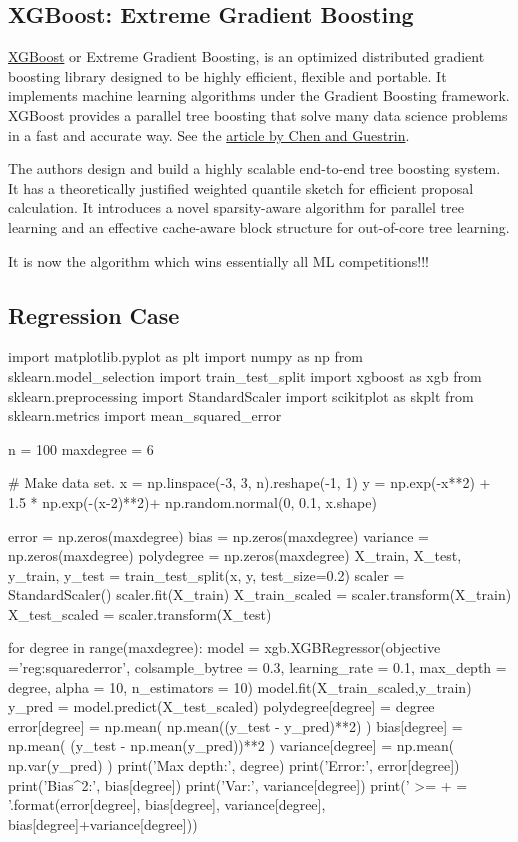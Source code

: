 \documentclass[%
oneside,                 %
final,                   %
10pt]{article}
\begin{document}
\subsection{XGBoost: Extreme Gradient Boosting}


\href{{https://github.com/dmlc/xgboost}}{XGBoost} or Extreme Gradient
Boosting, is an optimized distributed gradient boosting library
designed to be highly efficient, flexible and portable. It implements
machine learning algorithms under the Gradient Boosting
framework. XGBoost provides a parallel tree boosting that solve many
data science problems in a fast and accurate way. See the \href{{https://arxiv.org/abs/1603.02754}}{article by Chen and Guestrin}.

The authors design and build a highly scalable end-to-end tree
boosting system. It has  a theoretically justified weighted quantile
sketch for efficient proposal calculation. It introduces a novel sparsity-aware algorithm for parallel tree learning and an effective cache-aware block structure for out-of-core tree learning.

It is now the algorithm which wins essentially all ML competitions!!!

\subsection{Regression Case}

\bpycod
import matplotlib.pyplot as plt
import numpy as np
from sklearn.model_selection import train_test_split
import xgboost as xgb
from sklearn.preprocessing import StandardScaler
import scikitplot as skplt
from sklearn.metrics import mean_squared_error

n = 100
maxdegree = 6

# Make data set.
x = np.linspace(-3, 3, n).reshape(-1, 1)
y = np.exp(-x**2) + 1.5 * np.exp(-(x-2)**2)+ np.random.normal(0, 0.1, x.shape)

error = np.zeros(maxdegree)
bias = np.zeros(maxdegree)
variance = np.zeros(maxdegree)
polydegree = np.zeros(maxdegree)
X_train, X_test, y_train, y_test = train_test_split(x, y, test_size=0.2)
scaler = StandardScaler()
scaler.fit(X_train)
X_train_scaled = scaler.transform(X_train)
X_test_scaled = scaler.transform(X_test)

for degree in range(maxdegree):
    model =  xgb.XGBRegressor(objective ='reg:squarederror', colsample_bytree = 0.3, learning_rate = 0.1,
                max_depth = degree, alpha = 10, n_estimators = 10)
    model.fit(X_train_scaled,y_train)
    y_pred = model.predict(X_test_scaled)
    polydegree[degree] = degree
    error[degree] = np.mean( np.mean((y_test - y_pred)**2) )
    bias[degree] = np.mean( (y_test - np.mean(y_pred))**2 )
    variance[degree] = np.mean( np.var(y_pred) )
    print('Max depth:', degree)
    print('Error:', error[degree])
    print('Bias^2:', bias[degree])
    print('Var:', variance[degree])
    print('{} >= {} + {} = {}'.format(error[degree], bias[degree], variance[degree], bias[degree]+variance[degree]))
\end{document}
